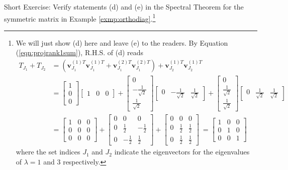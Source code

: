 Short Exercise: Verify statements (d) and (e) in the Spectral Theorem for the symmetric matrix in Example \ref{exmp:orthodiag}.\footnote{We will just show (d) here and leave (e) to the readers. By Equation (\ref{eqn:projrank1sum}), R.H.S. of (d) reads
\begin{align*}
T_{J_1} + T_{J_2} &= (\textbf{v}_{J_1}^{(1)T}\textbf{v}_{J_1}^{(1)T} + \textbf{v}_{J_1}^{(2)T}\textbf{v}_{J_1}^{(2)T}) + \textbf{v}_{J_2}^{(1)T}\textbf{v}_{J_2}^{(1)T} \\
&= \begin{bmatrix}
1 \\
0 \\
0
\end{bmatrix}
\begin{bmatrix}
1 & 0 & 0
\end{bmatrix} + 
\begin{bmatrix}
0 \\
-\frac{1}{\sqrt{2}} \\
\frac{1}{\sqrt{2}}
\end{bmatrix}
\begin{bmatrix}
0 & -\frac{1}{\sqrt{2}} & \frac{1}{\sqrt{2}}
\end{bmatrix} +
\begin{bmatrix}
0 \\
\frac{1}{\sqrt{2}} \\
\frac{1}{\sqrt{2}}
\end{bmatrix}
\begin{bmatrix}
0 & \frac{1}{\sqrt{2}} & \frac{1}{\sqrt{2}}
\end{bmatrix} \\
&=
\begin{bmatrix}
1 & 0 & 0 \\
0 & 0 & 0 \\
0 & 0 & 0
\end{bmatrix}
+
\begin{bmatrix}
0 & 0 & 0 \\
0 & \frac{1}{2} & -\frac{1}{2} \\
0 & -\frac{1}{2} & \frac{1}{2}
\end{bmatrix}
+
\begin{bmatrix}
0 & 0 & 0 \\
0 & \frac{1}{2} & \frac{1}{2} \\
0 & \frac{1}{2} & \frac{1}{2}
\end{bmatrix}\
=
\begin{bmatrix}
1 & 0 & 0 \\
0 & 1 & 0 \\
0 & 0 & 1
\end{bmatrix}
\end{align*}
where the set indices $J_1$ and $J_2$ indicate the eigenvectors for the eigenvalues of $\lambda = 1$ and $3$ respectively.
}

